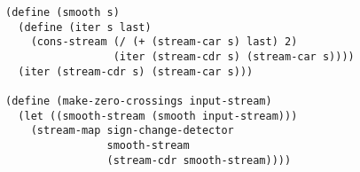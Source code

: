 \documentclass[a4paper,12pt]{article}
\begin{document}
\begin{lstlisting}
(define (smooth s)
  (define (iter s last)
    (cons-stream (/ (+ (stream-car s) last) 2)
                 (iter (stream-cdr s) (stream-car s))))
  (iter (stream-cdr s) (stream-car s)))

(define (make-zero-crossings input-stream)
  (let ((smooth-stream (smooth input-stream)))
    (stream-map sign-change-detector
                smooth-stream
                (stream-cdr smooth-stream))))
\end{lstlisting}
\end{document}
